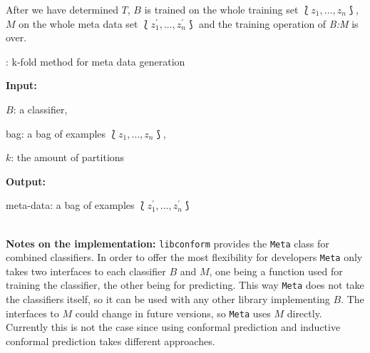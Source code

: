 \documentclass[twoside,11pt]{article}
\def\libconform{\texttt{libconform}}
\def\wo{~\\}
\begin{document}
After we have determined $T$, $B$ is trained on the whole
training set $\Lbag z_1,\dots,z_n \Rbag$, $M$ on the
whole meta data set
$\Lbag z^{\prime}_1,\dots,z^{\prime}_n \Rbag$ and the
training operation of \textit{B:M} is over.

\begin{algorithm}
  \caption{: k-fold method for meta data generation}
  \label{alg:kfoldmeta}

  \textbf{Input:}

  \quad $B$: a classifier,

  \quad bag: a bag of examples $\Lbag z_1,\dots,z_n \Rbag$,

  \quad $k$: the amount of partitions

  \textbf{Output:}

  \quad meta-data: a bag of examples
    $\Lbag z^{\prime}_1,\dots,z^{\prime}_n \Rbag$

  \begin{algorithmic}[1]
      \ENDFOR
    \ENDFOR
  \end{algorithmic}
\end{algorithm}
\wo

\noindent
\textbf{Notes on the implementation:}
\libconform{} provides the \texttt{Meta} class for
combined classifiers. In order to offer the most
flexibility for developers \texttt{Meta} only takes two
interfaces to each classifier $B$ and $M$, one being a
function used for training the classifier, the other being
for predicting. This way \texttt{Meta} does not take the
classifiers itself, so it can be used with any other
library implementing $B$. The interfaces to $M$ could
change in future versions, so \texttt{Meta} uses $M$
directly. Currently this is not the case since using
conformal prediction and inductive conformal prediction
takes different approaches.
\end{document}
